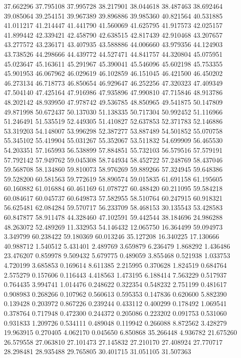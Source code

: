 37.662296
37.795108
37.995728
38.217901
38.044618
38.487463
38.692464
39.085064
39.254151
39.967389
39.896886
39.985360
40.821564
40.531885
41.011217
41.214447
41.441790
41.560069
41.625795
41.917573
42.025157
41.899442
42.339421
42.458790
42.638515
42.817439
42.910468
43.207657
43.277572
43.236171
43.407935
43.588886
44.006660
43.979356
44.124903
43.738526
44.298666
44.439772
44.527471
44.841757
44.320804
45.075951
45.023647
45.163611
45.291967
45.390041
45.546096
45.602198
45.753355
45.901953
46.067962
46.029619
46.102859
46.151045
46.421500
46.450202
46.273134
46.718773
46.850654
46.929647
46.252256
47.320323
47.409349
47.504140
47.425164
47.916986
47.935896
47.990810
47.715846
48.913786
48.202142
48.939950
47.978742
49.536785
48.850965
49.541875
50.147809
49.871998
50.672437
50.137030
51.138335
50.717304
50.992452
51.116966
51.246491
51.535519
52.449305
51.410827
52.637853
52.371783
52.146886
53.319203
54.148007
53.996298
52.387277
53.887489
54.501852
55.070758
55.345102
55.419904
55.031267
55.352067
53.511832
54.699909
56.465530
54.203351
57.165993
56.538899
57.884851
55.732103
56.579516
57.579191
57.792142
57.949762
59.045308
58.744934
58.452722
57.248769
58.437046
59.568708
58.134860
59.810073
58.976269
59.889266
57.324945
59.648386
59.528200
60.581563
59.772619
58.890574
59.015835
61.691158
61.195605
60.160882
61.016884
60.461169
61.078727
60.488420
60.211095
59.584218
60.084617
60.045737
60.649873
57.582955
58.510764
60.247915
60.918321
56.625481
62.084284
59.570717
56.233709
58.468153
30.135543
53.428583
60.847877
58.911478
44.328460
47.102591
59.442544
38.184696
24.986288
48.263072
52.489269
11.332953
54.146432
12.065750
16.364499
59.094973
3.349799
60.238422
59.180369
60.013246
35.127208
16.340225
17.130666
40.988712
1.540512
5.431401
2.489769
3.659879
6.236479
1.868292
1.436486
23.476207
0.859978
9.509432
5.679775
0.489059
3.855468
0.521938
1.033753
4.720199
3.685853
0.169614
8.611385
2.215995
0.370628
1.824519
0.684764
2.575279
0.157606
0.116443
4.418563
1.473195
6.188414
7.563229
0.517937
0.764435
3.994741
1.014476
0.248622
0.322354
0.548232
2.751199
0.481617
0.908983
0.268266
0.107962
0.560613
0.595353
0.147836
0.620600
5.882390
0.139428
0.203972
0.867226
0.239244
0.433112
0.400299
0.178492
1.069541
0.378764
0.717948
0.472300
0.244372
0.205086
0.223202
0.091753
0.531060
0.931833
1.209726
0.534111
0.489048
0.119942
0.266088
8.872562
3.428279
19.963915
0.270405
4.062170
0.045650
6.850868
35.266448
4.936782
21.675260
26.579558
27.063810
27.101473
27.145832
27.210170
27.408924
27.770717
28.298481
28.935488
29.765805
30.401715
31.051105
31.507363
